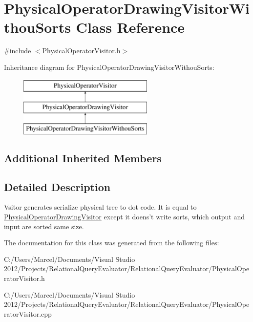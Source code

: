 \hypertarget{class_physical_operator_drawing_visitor_withou_sorts}{\section{Physical\+Operator\+Drawing\+Visitor\+Withou\+Sorts Class Reference}
\label{class_physical_operator_drawing_visitor_withou_sorts}
}


{\ttfamily \#include $<$Physical\+Operator\+Visitor.\+h$>$}

Inheritance diagram for Physical\+Operator\+Drawing\+Visitor\+Withou\+Sorts\+:\begin{figure}[H]
\begin{center}
\leavevmode
\includegraphics[height=3.000000cm]{class_physical_operator_drawing_visitor_withou_sorts}
\end{center}
\end{figure}
\subsection*{Additional Inherited Members}


\subsection{Detailed Description}
Vsitor generates serialize physical tree to dot code. It is equal to \hyperlink{class_physical_operator_drawing_visitor}{Physical\+Operator\+Drawing\+Visitor} except it doens't write sorts, which output and input are sorted same size. 

The documentation for this class was generated from the following files\+:\begin{DoxyCompactItemize}
\item 
C\+:/\+Users/\+Marcel/\+Documents/\+Visual Studio 2012/\+Projects/\+Relational\+Query\+Evaluator/\+Relational\+Query\+Evaluator/Physical\+Operator\+Visitor.\+h\item 
C\+:/\+Users/\+Marcel/\+Documents/\+Visual Studio 2012/\+Projects/\+Relational\+Query\+Evaluator/\+Relational\+Query\+Evaluator/Physical\+Operator\+Visitor.\+cpp\end{DoxyCompactItemize}
